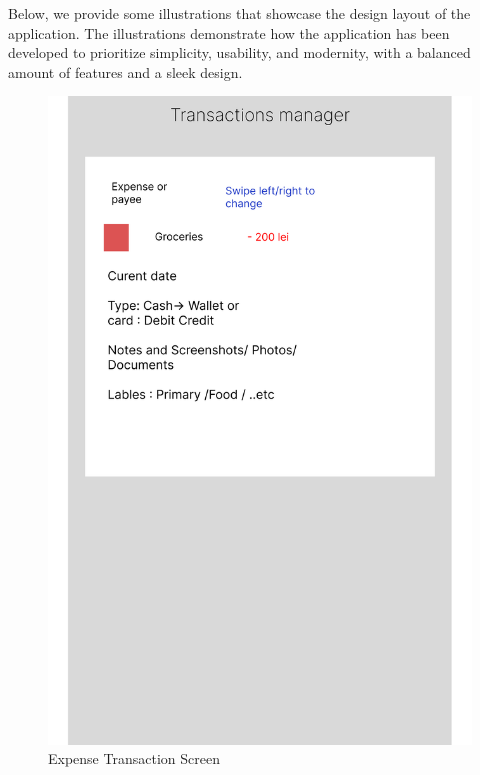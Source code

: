 \hspace{\parindent}Below, we provide some illustrations that showcase the design layout of the application. The illustrations demonstrate how the application has been developed to prioritize simplicity, usability, and modernity, with a balanced amount of features and a sleek design.

\begin{figure}[htbp]
  \centering
  \begin{minipage}[b]{0.32\textwidth}
    \includegraphics[width=\textwidth]{Graphics/Design/TM_E.png}
    \caption{Expense Transaction Screen}
    \label{fig:image1}
  \end{minipage}
  \hfill
  \begin{minipage}[b]{0.32\textwidth}

\end{minipage}
\end{figure}
